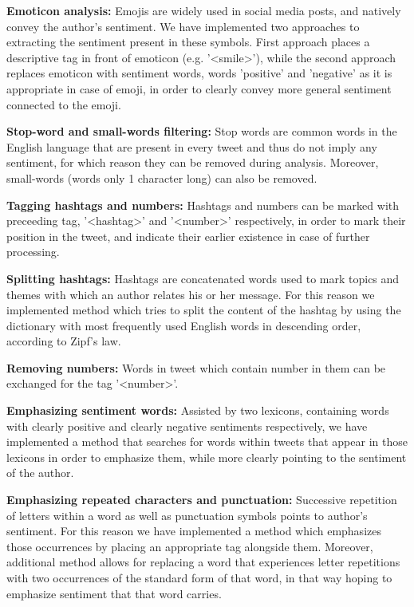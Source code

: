 \documentclass[10pt,conference]{IEEEtran}
\begin{document}
\textbf{Emoticon analysis:} Emojis are widely used in social media posts, and natively convey the author's sentiment. We have implemented two approaches to extracting the sentiment present in these symbols. First approach places a descriptive tag in front of emoticon (e.g. '<smile>'), while the second approach replaces emoticon with sentiment words, words 'positive' and 'negative' as it is appropriate in case of emoji, in order to clearly convey more general sentiment connected to the emoji.

\textbf{Stop-word and small-words filtering:} Stop words are common words in the English language that are present in every tweet and thus do not imply any sentiment, for which reason they can be removed during analysis. Moreover, small-words (words only 1 character long) can also be removed.

\textbf{Tagging hashtags and numbers:} Hashtags and numbers can be marked with preceeding tag,  '<hashtag>' and '<number>' respectively, in order to mark their position in the tweet, and indicate their earlier existence in case of further processing.

\textbf{Splitting hashtags:} Hashtags are concatenated words used to mark topics and themes with which an author relates his or her message. For this reason we implemented method which tries to split the content of the hashtag by using the dictionary with most frequently used English words in descending order, according to Zipf's law.

\textbf{Removing numbers:} Words in tweet which contain number in them can be exchanged for the tag '<number>'. 

\textbf{Emphasizing sentiment words:} Assisted by two lexicons, containing words with clearly positive and clearly negative sentiments respectively, we have implemented a method that searches for words within tweets that appear in those lexicons in order to emphasize them, while more clearly pointing to the sentiment of the author.

\textbf{Emphasizing repeated characters and punctuation:} Successive repetition of letters within a word as well as punctuation symbols points to author's sentiment. For this reason we have implemented a method which emphasizes those occurrences by placing an appropriate tag alongside them. Moreover, additional method allows for replacing a word that experiences letter repetitions with two occurrences of the standard form of that word, in that way hoping to emphasize sentiment that that word carries.
\end{document}
